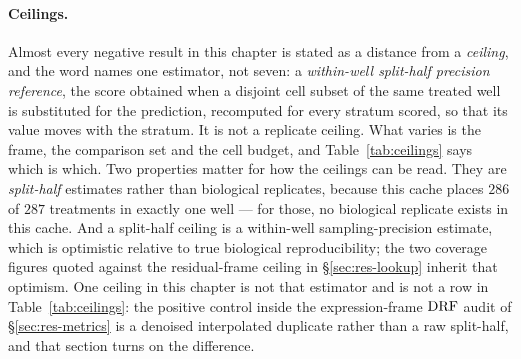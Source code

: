 \paragraph{Ceilings.} Almost every negative result in this chapter is stated as a distance from a
\emph{ceiling}, and the word names one estimator, not seven: a \emph{within-well split-half precision
reference}, the score obtained when a disjoint cell subset of the same treated well is substituted
for the prediction, recomputed for every stratum scored, so that its value moves with the stratum.
It is not a replicate ceiling. What varies is the frame, the comparison set
and the cell budget, and Table~\ref{tab:ceilings} says which is which. Two properties matter for how
the ceilings can be read. They are \emph{split-half} estimates rather than biological replicates,
because this cache places $286$ of $287$ treatments in exactly one well --- for those, no biological
replicate exists in this cache. And a split-half ceiling is a within-well sampling-precision
estimate,
which is optimistic relative to true biological reproducibility; the two coverage figures quoted
against the residual-frame ceiling in \S\ref{sec:res-lookup} inherit that optimism. One ceiling in
this chapter is not that estimator and is not a row in Table~\ref{tab:ceilings}: the positive
control inside the expression-frame $\textrm{DRF}$ audit of \S\ref{sec:res-metrics} is a denoised
interpolated duplicate rather than a raw split-half, and that section turns on the difference.

